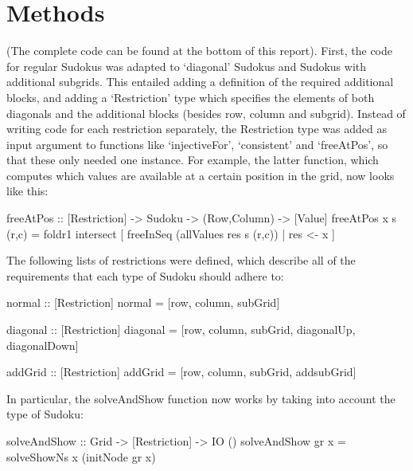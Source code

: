 \documentclass[12pt,a4paper]{article}
\begin{document}
\section{Methods}
(The complete code can be found at the bottom of this report). First, the code for regular Sudokus was adapted to `diagonal' Sudokus and Sudokus
with additional subgrids. This entailed adding a definition of the required additional blocks, and
adding a `Restriction' type which specifies the elements of both diagonals and the additional blocks
(besides row, column and subgrid).
Instead of writing code for each restriction separately, the Restriction type was added as input
argument to functions like `injectiveFor', `consistent' and `freeAtPos', so that these only needed one instance.
For example, the latter function, which computes which values are available at a certain position in the grid, now looks like this:
\begin{code}
freeAtPos :: [Restriction] -> Sudoku -> (Row,Column) -> [Value]
freeAtPos x s (r,c) = foldr1 intersect [ freeInSeq (allValues res s (r,c)) | res <- x ]
\end{code}
The following lists of restrictions were defined, which describe all of the requirements
that each type of Sudoku should adhere to:
\begin{code}
normal :: [Restriction]
normal = [row, column, subGrid]

diagonal :: [Restriction]
diagonal = [row, column, subGrid, diagonalUp, diagonalDown]

addGrid :: [Restriction]
addGrid = [row, column, subGrid, addsubGrid]
\end{code}
In particular, the solveAndShow function now works by taking into account the type of Sudoku:
\begin{code}
solveAndShow :: Grid -> [Restriction] -> IO ()
solveAndShow gr x = solveShowNs x (initNode gr x)
\end{code}
\end{document}
